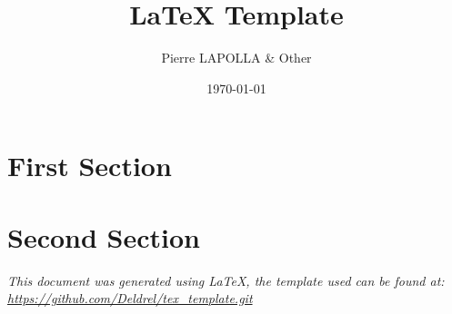 \documentclass[10pt]{article}
\title{\LaTeX{} Template}
\author{Pierre LAPOLLA \& Other}
\date{\today}
\begin{document}
    \maketitle

    \tableofcontents


    \section{First Section}\label{sec:first-section}
    


    \section{Second Section}\label{sec:second-section}
    

    \vfill
    \begin{center}
        \textit{This document was generated using \LaTeX{}, the template used can be found at: \\
        \url{https://github.com/Deldrel/tex_template.git}}
    \end{center}
\end{document}
